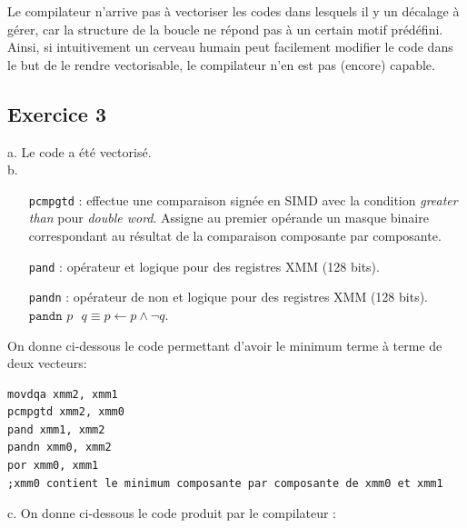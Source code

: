 \documentclass[11pt, a4 paper]{article}
\begin{document}
Le compilateur n'arrive pas à vectoriser les codes dans lesquels il y un décalage à gérer, car la structure de la boucle ne répond pas à un certain motif prédéfini. Ainsi, si intuitivement un cerveau humain peut facilement modifier le code dans le but de le rendre vectorisable, le compilateur n'en est pas (encore) capable.

\subsection{Exercice 3}
a. Le code a été vectorisé.\\

b. \begin{itemize}
    \item[\texttt{pcmpgtd}] : effectue une comparaison signée en SIMD avec la condition \textit{greater than} pour \textit{double word}. Assigne au premier opérande un masque binaire correspondant au résultat de la comparaison composante par composante.\\
    \item[\texttt{pand}] : opérateur et logique pour des registres XMM (128 bits).\\
    \item[\texttt{pandn}] : opérateur de non et logique pour des registres XMM (128 bits). $\texttt{pandn $p$ $q$} \equiv p \leftarrow p \wedge \neg q$.\\ 
\end{itemize}

On donne ci-dessous le code permettant d'avoir le minimum terme à terme de deux vecteurs:
\begin{lstlisting}[style=customasm]
movdqa xmm2, xmm1
pcmpgtd xmm2, xmm0
pand xmm1, xmm2
pandn xmm0, xmm2
por xmm0, xmm1
;xmm0 contient le minimum composante par composante de xmm0 et xmm1
\end{lstlisting}

\pagebreak
{}
c. On donne ci-dessous le code produit par le compilateur :\\
\end{document}
